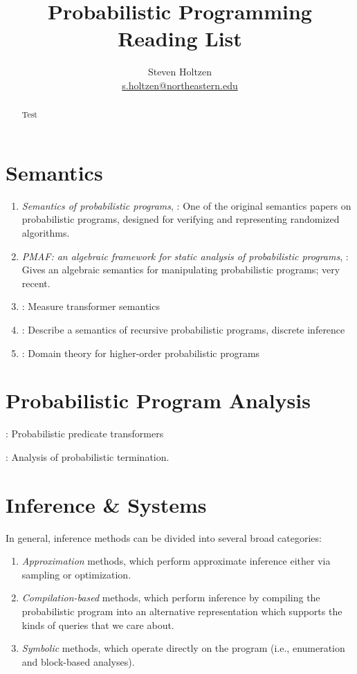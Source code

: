 \documentclass{article}
\title{Probabilistic Programming Reading List}
\author{Steven Holtzen\\\url{s.holtzen@northeastern.edu}}
\begin{document}
\maketitle

\begin{abstract}
  Test
\end{abstract}

\tableofcontents

\section{Semantics}
\begin{enumerate}
\item \emph{Semantics of probabilistic programs}, \citep{Kozen1981}: One of the
  original semantics papers on probabilistic programs, designed for verifying and
  representing randomized algorithms.
\item \emph{PMAF: an algebraic framework for static analysis of probabilistic
    programs}, \citep{Wang2018}: Gives an algebraic semantics for manipulating
  probabilistic programs; very recent.
\item \citep{Borgstrom2013}: Measure transformer semantics
\item \citep{Scibior2017}: Describe a semantics of recursive probabilistic
  programs, discrete inference
\item \citep{Vakar2019}: Domain theory for higher-order probabilistic programs
\end{enumerate}

\section{Probabilistic Program Analysis}

\item \citep{Morgan1996}: Probabilistic predicate transformers
\item \citep{FerrerFioriti2015}: Analysis of probabilistic termination.


\section{Inference \& Systems}
In general, inference methods can be divided into several broad categories:
\begin{enumerate}
\item \emph{Approximation} methods, which perform approximate inference either
  via sampling or optimization.
\item \emph{Compilation-based} methods, which perform inference by compiling
  the probabilistic program into an alternative representation which supports
  the kinds of queries that we care about.
\item \emph{Symbolic} methods, which operate directly on the program (i.e.,
  enumeration and block-based analyses).
\end{enumerate}
\end{document}
